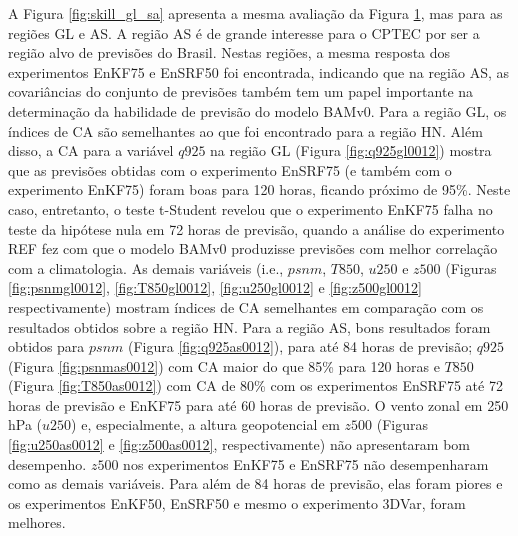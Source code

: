 \begin{figure}[H]
\begin{center}
{        }     
    \end{center}
    \vspace{2mm}
  \label{fig:skill_nh_tr_sh}
\end{figure}

A Figura \ref{fig:skill_gl_sa} apresenta a mesma avaliação da Figura \ref{fig:skill_nh_tr_sh}, mas para as regiões GL e AS. A região AS é de grande interesse para o CPTEC por ser a região alvo de previsões do Brasil. Nestas regiões, a mesma resposta dos experimentos EnKF75 e EnSRF50 foi encontrada, indicando que na região AS, as covariâncias do conjunto de previsões também tem um papel importante na determinação da habilidade de previsão do modelo BAMv0. Para a região GL, os índices de CA são semelhantes ao que foi encontrado para a região HN. Além disso, a CA para a variável $q925$ na região GL (Figura \ref{fig:q925gl0012}) mostra que as previsões obtidas com o experimento EnSRF75 (e também com o experimento EnKF75) foram boas para 120 horas, ficando próximo de 95\%. Neste caso, entretanto, o teste t-Student revelou que o experimento EnKF75 falha no teste da hipótese nula em 72 horas de previsão, quando a análise do experimento REF fez com que o modelo BAMv0 produzisse previsões com melhor correlação com a climatologia. As demais variáveis (i.e., $psnm$, $T850$, $u250$ e $z500$ (Figuras \ref{fig:psnmgl0012}, \ref{fig:T850gl0012}, \ref{fig:u250gl0012} e \ref{fig:z500gl0012} respectivamente) mostram índices de CA semelhantes em comparação com os resultados obtidos sobre a região HN. Para a região AS, bons resultados foram obtidos para $psnm$ (Figura \ref{fig:q925as0012}), para até 84 horas de previsão; $q925$ (Figura \ref{fig:psnmas0012}) com CA maior do que 85\% para 120 horas e $T850$ (Figura \ref{fig:T850as0012}) com CA de 80\% com os experimentos EnSRF75 até 72 horas de previsão e EnKF75 para até 60 horas de previsão. O vento zonal em 250 hPa ($u250$) e, especialmente, a altura geopotencial em $z500$ (Figuras \ref{fig:u250as0012} e \ref{fig:z500as0012}, respectivamente) não apresentaram bom desempenho. $z500$ nos experimentos EnKF75 e EnSRF75 não desempenharam como as demais variáveis. Para além de 84 horas de previsão, elas foram piores e os experimentos EnKF50, EnSRF50 e mesmo o experimento 3DVar, foram melhores.

